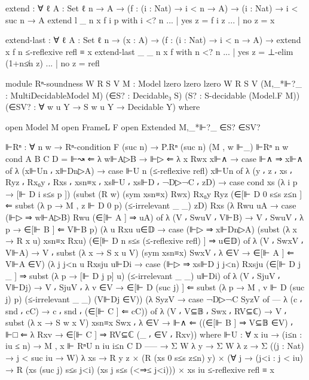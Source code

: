 \begin{spverbatim}
extend : ∀ {ℓ} {A : Set ℓ} {n} → A → (f : (i : Nat) → {i < n} → A) → (i : Nat) → {i < suc n} → A
extend {l} {_} {n} x f i {p} with i <? n
... | yes z = f i {z}
... | no z = x

extend-last : ∀ {ℓ} {A : Set ℓ} {n} → (x : A) → (f : (i : Nat) → {i < n} → A) → extend x f n {≤-reflexive refl} ≡ x
extend-last {_} {_} {n} x f with n <? n
... | yes z = ⊥-elim (1+n≰n z)
... | no z = refl

module Rⁿ-soundness
  {W R S V}
  {M : Model {lzero} {lzero} {lzero} W R S V}
  (M,_*⊩?_ : MultiDecidableModel M)
  (∈S? : Decidable₃ S)
  (S? : S-decidable (Model.F M))
  (∈SV? : ∀ {w u Y} → S w u Y → Decidable Y) where

  open Model M
  open FrameL F
  open Extended M,_*⊩?_ ∈S? ∈SV?

  ⊩Rⁿ : ∀ {n w} → Rⁿ-condition F (suc n) → P.Rⁿ (suc n) (M , w ⊩_)
  ⊩Rⁿ {n} {w} cond {A} {B} {C} D = ⊩↝ ⇐ λ { w⊩A▷B → ⊩▷ ⇐
    λ { {x} Rwx x⊩∧ → case ⊩∧ ⇒ x⊩∧ of
    λ { (x⊩Un ⸴ x⊩Dn▷A) → case ⊩U n (≤-reflexive refl) x⊩Un of
      λ { (y ⸴ z ⸴ xs ⸴ Ryz ⸴ Rx₀y ⸴ Rxs ⸴ xsn≡x ⸴ xs⊩U ⸴ xs⊩D ⸴ ¬D▷¬C ⸴ zD)
      → case cond xs (λ {i p → [⊩ D i {s≤s p} ]}) (subst (R w) (sym xsn≡x) Rwx)
        Rx₀y Ryz (∈[⊩ D 0 {s≤s z≤n} ] ⇐ subst (λ p → M , z ⊩ D 0 {p})
          (≤-irrelevant _ _) zD) Rxs
        (λ {Rwu uA → case (⊩▷ ⇒ w⊩A▷B) Rwu (∈[⊩ A ] ⇒ uA) of
        λ { (V ⸴ SwuV ⸴ V⊩B) → V ⸴ SwuV ⸴ λ {p → ∈[⊩ B ] ⇐ V⊩B p}}})
        (λ { {u} Rxu u∈𝔻 → case (⊩▷ ⇒ x⊩Dn▷A) (subst (λ x → R x u) xsn≡x Rxu)
        (∈[⊩ D n {s≤s (≤-reflexive refl)} ] ⇒ u∈𝔻) of
        λ { (V ⸴ SwxV ⸴ V⊩A) → V ⸴ subst (λ x → S x u V) (sym xsn≡x) SwxV ⸴
        λ {∈V → ∈[⊩ A ] ⇐ V⊩A ∈V}}})
        (λ {j j<n {u} Rxsju u⊩Di → case (⊩▷ ⇒ xs⊩D j j<n) Rxsju
        (∈[⊩ D j {_} ] ⇒ subst (λ {p → [⊩ D j {p}] u}) (≤-irrelevant _ _) u⊩Di) of
          λ { (V ⸴ SjuV ⸴ V⊩Dj) → V ⸴ SjuV ⸴ λ { {v} ∈V → ∈[⊩ D (suc j) ]
          ⇐ subst (λ p → M , v ⊩ D (suc j) {p}) (≤-irrelevant _ _) (V⊩Dj ∈V)}}})
        (λ {SyzV → case ¬D▷¬C SyzV of
        ---
        λ { (c ⸴ snd ⸴ cC) → c ⸴ snd ⸴ (∈[⊩ C ] ⇐ cC)}})
        of λ { (V ⸴ V⊆𝔹 ⸴ Swx ⸴ RV⊆ℂ) → V ⸴ subst (λ x → S w x V) xsn≡x Swx
        ⸴ λ {∈V → ⊩∧ ⇐ ((∈[⊩ B ] ⇒ V⊆𝔹 ∈V) ⸴ ⊩□ ⇐
        λ {Rxv → ∈[⊩ C ] ⇒ RV⊆ℂ (_ ⸴ ∈V ⸴ Rxv)})}}}}}}
    where
    ⊩U : ∀ {x} iu → (i≤n : iu ≤ n)
      → M , x ⊩ RⁿU n iu {i≤n} {C} {D}
      -----
      → Σ W λ y → Σ W λ z
      → Σ ((j : Nat) → {j < suc iu} → W) λ xs
      → R y z
        × (R (xs 0 {s≤s z≤n}) y)
        × (∀ j → (j<i : j < iu) → R (xs (suc j) {s≤s j<i}) (xs j {s≤s (<⇒≤ j<i)}))
        × xs iu {≤-reflexive refl} ≡ x

\end{spverbatim}
